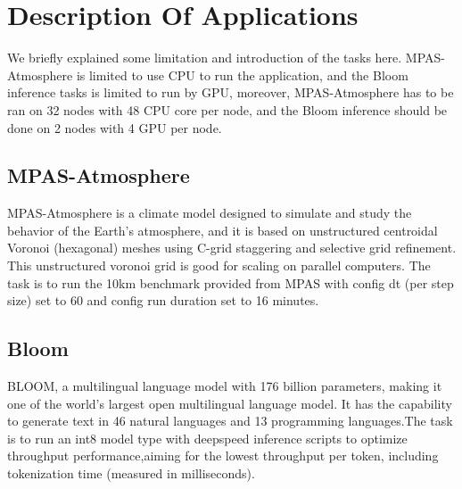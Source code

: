 \section{Description Of Applications}
\label{sec:conc}

We briefly explained some limitation and introduction of the tasks here. MPAS-Atmosphere is limited to use CPU to run the application, and the Bloom inference tasks is limited to run by GPU, moreover, MPAS-Atmosphere has to be ran on 32 nodes with 48 CPU core per node, and the Bloom inference should be done on 2 nodes with 4 GPU per node.

\subsection{MPAS-Atmosphere}
MPAS-Atmosphere is a climate model designed to simulate and study the behavior of the Earth's atmosphere, and it is based on unstructured centroidal Voronoi (hexagonal) meshes using C-grid staggering and selective grid refinement. This unstructured voronoi grid is good for scaling on parallel computers. The task is to run the 10km benchmark provided from MPAS with config dt (per step size) set to 60 and config run duration set to 16 minutes.

\subsection{Bloom}
BLOOM, a multilingual language model with 176 billion parameters, making it one of the world's largest open multilingual language model. It has the capability to generate text in 46 natural languages and 13 programming languages.The task is to run an int8 model type with deepspeed inference scripts to optimize throughput performance,aiming for the lowest throughput per token, including tokenization time (measured in milliseconds).